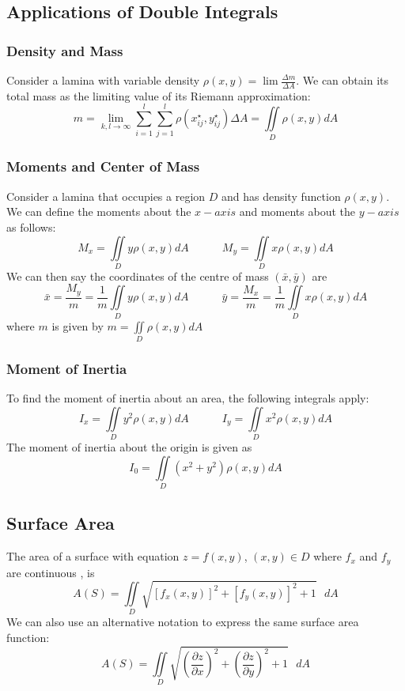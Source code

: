 \documentclass[11pt]{article}
\begin{document}
\subsection{Applications of Double Integrals}
\subsubsection{Density and Mass}
Consider a lamina with variable density $\rho(x,y) = \lim\frac{\Delta m}{\Delta A}$. We can obtain its total mass as the limiting value of its Riemann approximation:
$$ m = \lim_{k,l \to \infty} \sum_{i=1}^{l} \sum_{j=1}^{l} \rho (x_{ij}^{\star}, y_{ij}^{\star})\Delta A = \iint\limits_{D} \rho(x,y)dA  $$
\subsubsection{Moments and Center of Mass}
Consider a lamina that occupies a region $D$ and has density function $\rho (x,y)$. We can define the moments about the $x-axis$ and moments about the $y-axis$ as follows:
$$M_x = \iint\limits_{D} y\rho (x,y)dA \quad \quad \quad M_y = \iint\limits_{D} x\rho (x,y)dA$$
We can then say the coordinates of the centre of mass $(\bar x , \bar y)$ are  
$$ \bar x = \frac{M_y}{m} = \frac{1}{m}\iint\limits_{D} y\rho (x,y)dA \quad \quad \quad \bar y = \frac{M_x}{m} = \frac{1}{m}\iint\limits_{D} x\rho (x,y)dA$$
where $m$ is given by $m = \iint\limits_{D} \rho (x,y)dA$
\subsubsection{Moment of Inertia}
To find the moment of inertia about an area, the following integrals apply: 
$$I_x = \iint\limits_{D} y^2\rho (x,y)dA \quad \quad \quad I_y = \iint\limits_{D} x^2\rho (x,y)dA$$
The moment of inertia about the origin is given as 
$$ I_0 = \iint\limits_{D} (x^2 + y^2)\rho (x,y)dA$$
\subsection{Surface Area}
The area of a surface with equation $z = f(x,y)$, $(x,y) \in D$ where $f_x$ and $f_y$ are continuous , is 
$$ A(S) = \iint\limits_{D} \sqrt{[f_x(x,y)]^2 + [f_y(x,y)]^2+1} \text{ } dA $$
We can also use an alternative notation to express the same surface area function:
$$ A(S) = \iint\limits_{D} \sqrt{\left(\frac{\partial z}{\partial x}\right)^2 + \left(\frac{\partial z}{\partial y}\right)^2+1} \text{ } dA $$
\end{document}
